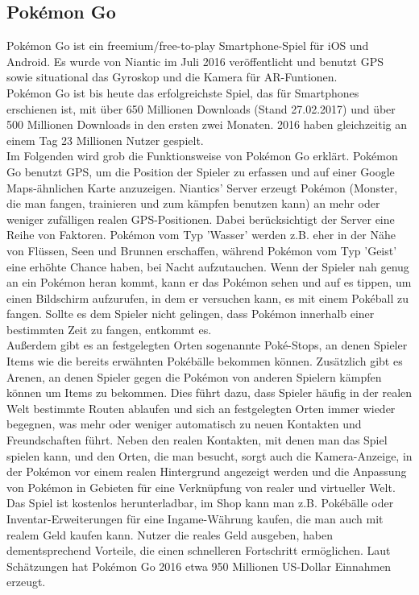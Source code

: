 \documentclass[extern,palatino]{cgBA}
\begin{document}
\subsection{Pokémon Go}
Pokémon Go ist ein freemium/free-to-play Smartphone-Spiel für iOS und Android. Es wurde von Niantic im Juli 2016 veröffentlicht und benutzt GPS sowie situational das Gyroskop und die Kamera für AR-Funtionen.
\\Pokémon Go ist bis heute das erfolgreichste Spiel, das für Smartphones erschienen ist, mit über 650 Millionen Downloads (Stand 27.02.2017) und über 500 Millionen Downloads in den ersten zwei  Monaten.%
2016 haben gleichzeitig an einem Tag 23 Millionen Nutzer gespielt.
\\
Im Folgenden wird grob die Funktionsweise von Pokémon Go erklärt. Pokémon Go benutzt GPS, um die Position der Spieler zu erfassen und auf einer Google Maps-ähnlichen Karte anzuzeigen.
Niantics' Server erzeugt Pokémon (Monster, die man fangen, trainieren und zum kämpfen benutzen kann) an mehr oder weniger zufälligen realen GPS-Positionen. Dabei berücksichtigt der Server eine Reihe von Faktoren. Pokémon vom Typ 'Wasser' werden z.B. eher in der Nähe von Flüssen, Seen und Brunnen erschaffen, während Pokémon vom Typ 'Geist' eine erhöhte Chance haben, bei Nacht aufzutauchen. Wenn der Spieler nah genug an ein Pokémon heran kommt, kann er das Pokémon sehen und auf es tippen, um einen Bildschirm aufzurufen, in dem er versuchen kann, es mit einem Pokéball zu fangen. Sollte es dem Spieler nicht gelingen, dass Pokémon innerhalb einer bestimmten Zeit zu fangen, entkommt es.
\\Außerdem gibt es an festgelegten Orten sogenannte Poké-Stops, an denen Spieler Items wie die bereits erwähnten Pokébälle bekommen können. Zusätzlich gibt es Arenen, an denen Spieler gegen die Pokémon von anderen Spielern kämpfen können um Items zu bekommen. Dies führt dazu, dass Spieler häufig in der realen Welt bestimmte Routen ablaufen und sich an festgelegten Orten immer wieder begegnen, was mehr oder weniger automatisch zu neuen Kontakten und Freundschaften führt. Neben den realen Kontakten, mit denen man das Spiel spielen kann, und den Orten, die man besucht, sorgt auch die Kamera-Anzeige, in der Pokémon vor einem realen Hintergrund angezeigt werden und die Anpassung von Pokémon in Gebieten für eine Verknüpfung von realer und virtueller Welt. 
\\Das Spiel ist kostenlos herunterladbar, im Shop kann man z.B. Pokébälle oder Inventar-Erweiterungen für eine Ingame-Währung kaufen, die man auch mit realem Geld kaufen kann. Nutzer die reales Geld ausgeben, haben dementsprechend Vorteile, die einen schnelleren Fortschritt ermöglichen. Laut Schätzungen hat Pokémon Go 2016 etwa 950 Millionen US-Dollar Einnahmen erzeugt.%
\end{document}
